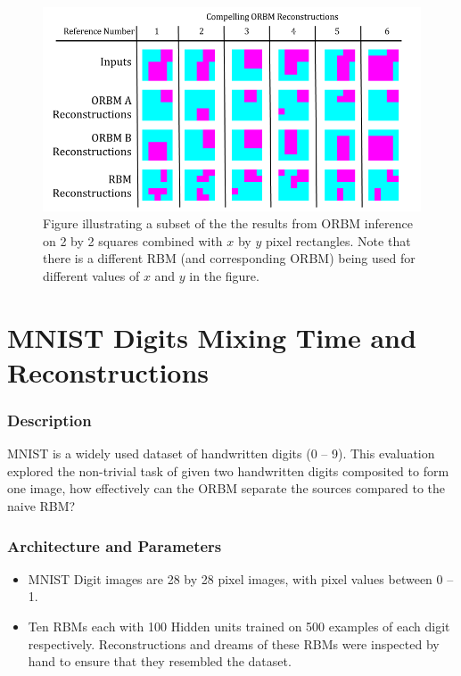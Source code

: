 \begin{figure}[htb]
  \begin{center}
    \includegraphics[width=\textwidth]{Assets/results/rect-sq-orbm-results.png}
  \end{center}
  \caption{Figure illustrating a subset of the the results from ORBM inference on 2 by 2 squares combined with $x$ by $y$ pixel rectangles. Note that there is a different RBM (and corresponding ORBM) being used for different values of $x$ and $y$ in the figure.}
  \label{F:rect-orbm-results}
\end{figure}


  \section{MNIST Digits Mixing Time and Reconstructions}

  \subsubsection{Description}
  MNIST is a widely used dataset of handwritten digits (0 -- 9). This evaluation explored the non-trivial task of given two handwritten digits composited to form one image, how effectively can the ORBM separate the sources compared to the naive RBM?

  \subsubsection{Architecture and Parameters}

  \begin{itemize}
    \item MNIST Digit images are 28 by 28 pixel images, with pixel values between 0 -- 1.
    \item Ten RBMs each with 100 Hidden units trained on 500 examples of each digit respectively. Reconstructions and dreams of these RBMs were inspected by hand to ensure that they resembled the dataset.
  \end{itemize}

